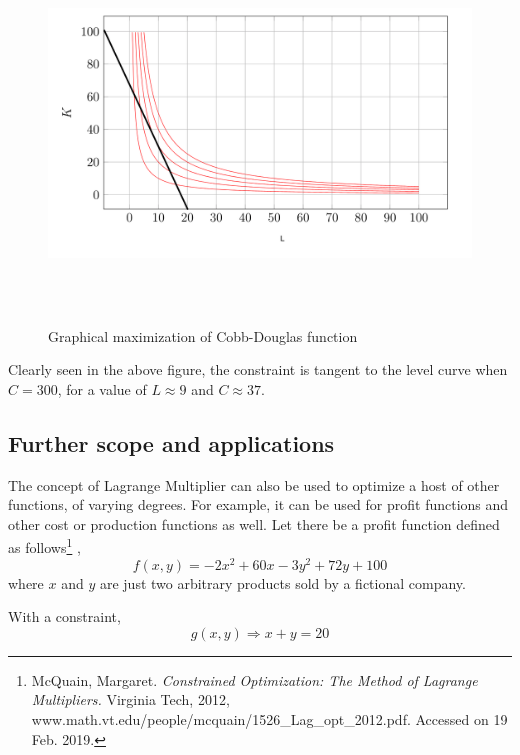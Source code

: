 \documentclass[a4paper,12pt]{article}
\theoremstyle{definition}
\begin{document}
\begin{figure}[H]
    \centering
    \includegraphics[width=\textwidth,height=10cm,keepaspectratio]{graph}
    \caption{Graphical maximization of Cobb-Douglas function}
    \label{fig:measurements}
\end{figure}

Clearly seen in the above figure, the constraint is tangent to the level curve when $C=300$, for a value of $L\approx 9$ and $C \approx 37$.







\subsection{Further scope and applications}
The concept of Lagrange Multiplier can also be used to optimize a host of other functions, of varying degrees. For example, it can be used for profit functions and other cost or production functions as well. Let there be a profit function defined as follows\footnote{McQuain, Margaret. \textit{Constrained Optimization: The Method of Lagrange Multipliers.} Virginia Tech, 2012, www.math.vt.edu/people/mcquain/1526\_Lag\_opt\_2012.pdf. Accessed on 19 Feb. 2019.} ,
\begin{equation}
	f(x,y)= -2x^2 +60x -3y^2 +72y +100
\end{equation}
where $x$ and $y$ are just two arbitrary products sold by a fictional company.

With a constraint,
\begin{equation}\label{eq:newconstraint}
	g(x,y)\Rightarrow x+y=20
\end{equation}
\end{document}
